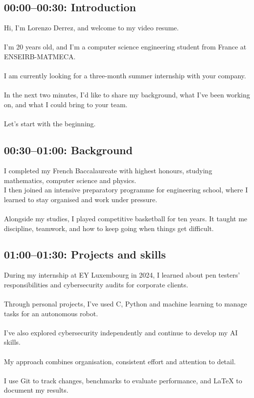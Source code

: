 \documentclass{article}
\begin{document}
\subsection*{00:00--00:30: Introduction}

Hi, I'm Lorenzo Derrez, and welcome to my video resume.
\\
\\
I'm 20 years old, and I'm a computer science engineering student from France at ENSEIRB-MATMECA.
\\
\\
I am currently looking for a three-month summer internship with your company.
\\
\\
In the next two minutes, I'd like to share my background, what I've been working on, and what I could bring to your team.
\\
\\
Let's start with the beginning. 

\subsection*{00:30--01:00: Background}

I completed my French Baccalaureate with highest honours, studying mathematics, computer science and physics.
\\
I then joined an intensive preparatory programme for engineering school, where I learned to stay organised and work under pressure.
\\
\\
Alongside my studies, I played competitive basketball for ten years. It taught me discipline, teamwork, and how to keep going when things get difficult.

\subsection*{01:00--01:30: Projects and skills}

During my internship at EY Luxembourg in 2024, I learned about pen testers’ responsibilities and cybersecurity audits for corporate clients.
\\
\\
Through personal projects, I’ve used C, Python and machine learning to manage tasks for an autonomous robot. 
\\
\\
I’ve also explored cybersecurity independently and continue to develop my AI skills.
\\
\\
My approach combines organisation, consistent effort and attention to detail. 
\\
\\
I use Git to track changes, benchmarks to evaluate performance, and LaTeX to document my results.
\end{document}

